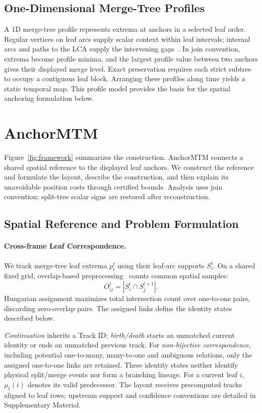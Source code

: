 \subsection{One-Dimensional Merge-Tree Profiles}
A 1D merge-tree profile represents extrema at anchors in a selected leaf order. Regular vertices on leaf arcs supply scalar context within leaf intervals; internal arcs and paths to the LCA supply the intervening gaps~\cite{Koepp:2023:TMTM,STMTM:2026}. In join convention, extrema become profile minima, and the largest profile value between two anchors gives their displayed merge level. Exact preservation requires each strict subtree to occupy a contiguous leaf block. Arranging these profiles along time yields a static temporal map. This profile model provides the basis for the spatial anchoring formulation below.




\section{AnchorMTM}\label{sec:method}
Figure~\ref{fig:framework} summarizes the construction. AnchorMTM connects a shared spatial reference to the displayed leaf anchors. We construct the reference and formulate the layout, describe the construction, and then explain its unavoidable position costs through certified bounds. Analysis uses join convention; split-tree scalar signs are restored after reconstruction.

\subsection{Spatial Reference and Problem Formulation}\label{sec:reference}
\paragraph{Cross-frame Leaf Correspondence.}
We track merge-tree leaf extrema $p_i^t$ using their leaf-arc supports $S_i^t$. On a shared fixed grid, overlap-based preprocessing~\cite{STMTM:2026} counts common spatial samples:
\begin{equation}\label{eq:overlap}
 O_{ij}^t=|S_i^t\cap S_j^{t+1}|.
\end{equation}
Hungarian assignment maximizes total intersection count over one-to-one pairs, discarding zero-overlap pairs. The assigned links define the identity states described below.

\emph{Continuation} inherits a Track ID; \emph{birth/death} starts an unmatched current identity or ends an unmatched previous track. For \emph{non-bijective correspondence}, including potential one-to-many, many-to-one and ambiguous relations, only the assigned one-to-one links are retained. These identity states neither identify physical split/merge events nor form a branching lineage. For a current leaf $i$, $\mu_t(i)$ denotes its valid predecessor. The layout receives precomputed tracks aligned to leaf rows; upstream support and confidence conventions are detailed in Supplementary Material.


